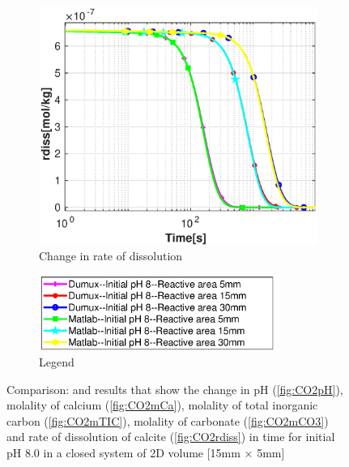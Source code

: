 \begin{figure}
\begin{subfigure}{.5\linewidth}
    \end{subfigure}%
    \hfill
    \begin{subfigure}{.5\linewidth}
            \centering
        \includegraphics[width=\textwidth]{PICTURES/dvm_pH8_rdiss.eps}
        \caption{Change in rate of dissolution}
        \label{fig:dvmpH8rdiss}
    \end{subfigure}%
   \hfill
   \begin{subfigure}{.5\linewidth}
            \centering
        \includegraphics[width=0.85\textwidth]{PICTURES/dvm_pH8_legend.eps}
        \caption{Legend}
        \label{fig:dvmpH8legend}
    \end{subfigure}%
   \caption{Comparison: \DuMuX and \MATLAB results that show the change in pH (\cref{fig:CO2pH}), molality of calcium (\cref{fig:CO2mCa}), molality of total inorganic carbon (\cref{fig:CO2mTIC}), molality of carbonate (\cref{fig:CO2mCO3}) and rate of dissolution of calcite (\cref{fig:CO2rdiss}) in time for initial pH 8.0 in a closed system of 2D volume [15mm $\times$ 5mm]} 
    \label{fig:comparisionDumuxMatlab_pH8.0}
\end{figure}
   
